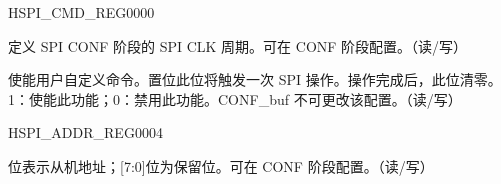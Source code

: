 \begin{register}{H}{SPI\_CMD\_REG}{\hexprefix{}0000}\label{regdesc:SPICMDREG}
%
%
%
%
\regnewline%
\begin{regdesc}\begin{reglist}
\label{fielddesc:SPICONFBITLEN}\item [SPI\_CONF\_BITLEN] 定义 SPI CONF 阶段的 SPI CLK 周期。可在 CONF 阶段配置。（读/写）
\label{fielddesc:SPIUSR}\item [SPI\_USR] 使能用户自定义命令。置位此位将触发一次 SPI 操作。操作完成后，此位清零。1：使能此功能；0：禁用此功能。CONF\_buf 不可更改该配置。（读/写）
\end{reglist}\end{regdesc}
\end{register}


\begin{register}{H}{SPI\_ADDR\_REG}{\hexprefix{}0004}\label{regdesc:SPIADDRREG}
%
\regnewline%
\begin{regdesc}\begin{reglist}
\label{fielddesc:SPIUSRADDRVALUE}\item [SPI\_USR\_ADDR\_VALUE] [31:8] 位表示从机地址；[7:0]位为保留位。可在 CONF 阶段配置。（读/写）
\end{reglist}\end{regdesc}
\end{register}


